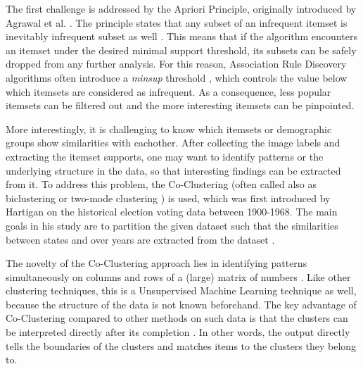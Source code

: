 The first challenge is addressed by the Apriori Principle, originally introduced by Agrawal et al. \cite{mining_sequential_patterns_agrawal}. The principle states that any subset of an infrequent itemset is inevitably infrequent subset as well \cite{mining_sequential_patterns_agrawal, introtodatamining}. This means that if the algorithm encounters an itemset under the desired minimal support threshold, its subsets can be safely dropped from any further analysis. For this reason, Association Rule Discovery algorithms often introduce a \emph{minsup} threshold \cite{database_mining_agrawal, mining_association_rules_agrawal, introtodatamining}, which controls the value below which itemsets are considered as infrequent. As a consequence, less popular itemsets can be filtered out and the more interesting itemsets can be pinpointed. 

More interestingly, it is challenging to know which itemsets or demographic groups show similarities with eachother. After collecting the image labels and extracting the itemset supports, one may want to identify patterns or the underlying structure in the data, so that interesting findings can be extracted from it. To address this problem, the Co-Clustering (often called also as biclustering or two-mode clustering \cite{coclustering}) is used, which was first introduced by Hartigan \cite{hartigan-direct-clustering-data-1972} on the historical election voting data between 1900-1968. The main goals in his study are to partition the given dataset such that the similarities between states and over years are extracted from the dataset \cite{hartigan-direct-clustering-data-1972}. 

The novelty of the Co-Clustering approach lies in identifying patterns simultaneously on columns and rows of a (large) matrix of numbers \cite{hartigan-direct-clustering-data-1972, coclustering}. Like other clustering techniques, this is a Unsupervised Machine Learning technique as well, because the structure of the data is not known beforehand. The key advantage of Co-Clustering compared to other methods on such data is that the clusters can be interpreted directly after its completion \cite{hartigan-direct-clustering-data-1972}. In other words, the output directly tells the boundaries of the clusters and matches items to the clusters they belong to.

